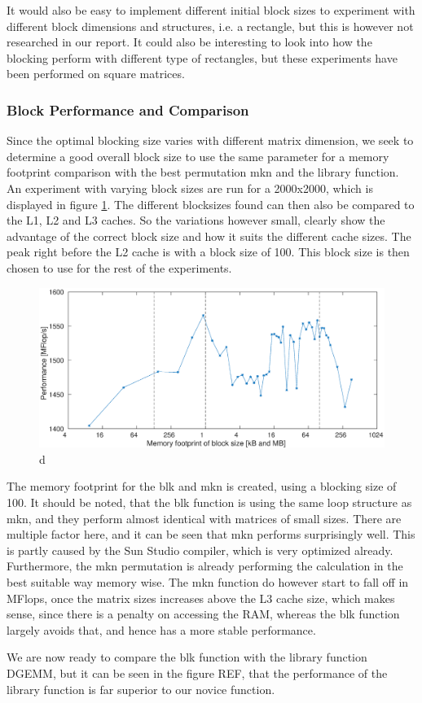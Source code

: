 It would also be easy to implement different initial block sizes to experiment with different block dimensions and structures, i.e. a rectangle, but this is however not researched in our report. It could also be interesting to look into how the blocking perform with different type of rectangles, but these experiments have been performed on square matrices.


\subsubsection{Block Performance and Comparison}

Since the optimal blocking size varies with different matrix dimension, we seek to determine a good overall block size to use the same parameter for a memory footprint comparison with the best permutation mkn and the library function.\\
An experiment with varying block sizes are run for a 2000x2000, which is displayed in figure \ref{fig:optblock}. The different blocksizes found can then also be compared to the L1, L2 and L3 caches. So the variations however small, clearly show the advantage of the correct block size and how it suits the different cache sizes. The peak right before the L2 cache is with a block size of 100. This block size is then chosen to use for the rest of the experiments.

\begin{figure}[h!] 
	\begin{center}
		\includegraphics[width=0.8 \textwidth]{fig/optimalBlock.eps} 
		\caption{d}
		\label{fig:optblock}
	\end{center}
\end{figure}

The memory footprint for the blk and mkn is created, using a blocking size of 100. It should be noted, that the blk function is using the same loop structure as mkn, and they perform almost identical with matrices of small sizes. There are multiple factor here, and it can be seen that mkn performs surprisingly well. This is partly caused by the Sun Studio compiler, which is very optimized already. Furthermore, the mkn permutation is already performing the calculation in the best suitable way memory wise. The mkn function do however start to fall off in MFlops, once the matrix sizes increases above the L3 cache size, which makes sense, since there is a penalty on accessing the RAM, whereas the blk function largely avoids that, and hence has a more stable performance.




We are now ready to compare the blk function with the library function DGEMM, but it can be seen in the figure REF, that the performance of the library function is far superior to our novice function.